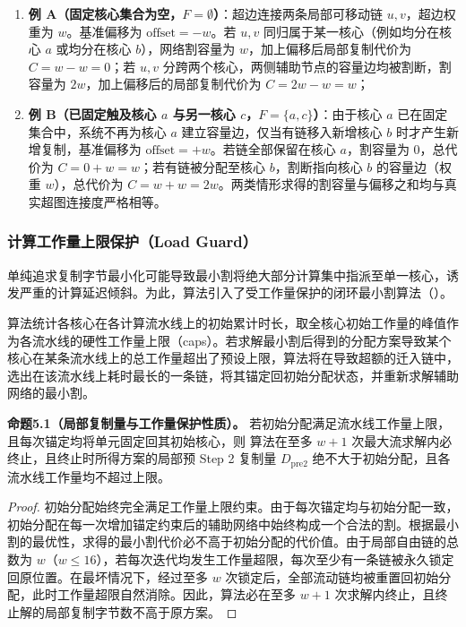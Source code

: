 \documentclass[anonymous,notoc]{gmcm2026}
\providecommand{\tightlist}{\setlength{\itemsep}{0pt}\setlength{\parskip}{0pt}}
\begin{document}
\begin{enumerate}
\def\labelenumi{\arabic{enumi}.}
\tightlist
\item
  \textbf{例 A（固定核心集合为空，\(F = \emptyset\)）}：超边连接两条局部可移动链 \(u, v\)，超边权重为 \(w\)。基准偏移为 \(\text{offset} = -w\)。若 \(u, v\) 同归属于某一核心（例如均分在核心 \(a\) 或均分在核心 \(b\)），网络割容量为 \(w\)，加上偏移后局部复制代价为 \(C = w - w = 0\)；若 \(u, v\) 分跨两个核心，两侧辅助节点的容量边均被割断，割容量为 \(2w\)，加上偏移后的局部复制代价为 \(C = 2w - w = w\)；
\item
  \textbf{例 B（已固定触及核心 \(a\) 与另一核心 \(c\)，\(F = \{a, c\}\)）}：由于核心 \(a\) 已在固定集合中，系统不再为核心 \(a\) 建立容量边，仅当有链移入新增核心 \(b\) 时才产生新增复制，基准偏移为 \(\text{offset} = +w\)。若链全部保留在核心 \(a\)，割容量为 0，总代价为 \(C = 0 + w = w\)；若有链被分配至核心 \(b\)，割断指向核心 \(b\) 的容量边（权重 \(w\)），总代价为 \(C = w + w = 2w\)。两类情形求得的割容量与偏移之和均与真实超图连接度严格相等。
\end{enumerate}

\subsubsection{计算工作量上限保护（Load Guard）}

单纯追求复制字节最小化可能导致最小割将绝大部分计算集中指派至单一核心，诱发严重的计算延迟倾斜。为此，算法引入了受工作量保护的闭环最小割算法（\texttt{}）。

算法统计各核心在各计算流水线上的初始累计时长，取全核心初始工作量的峰值作为各流水线的硬性工作量上限（caps）。若求解最小割后得到的分配方案导致某个核心在某条流水线上的总工作量超出了预设上限，算法将在导致超额的迁入链中，选出在该流水线上耗时最长的一条链，将其锚定回初始分配状态，并重新求解辅助网络的最小割。

\textbf{命题5.1（局部复制量与工作量保护性质）。} 若初始分配满足流水线工作量上限，且每次锚定均将单元固定回其初始核心，则 \texttt{} 算法在至多 \(w + 1\) 次最大流求解内必终止，且终止时所得方案的局部预 Step 2 复制量 \(D_{\mathrm{pre2}}\) 绝不大于初始分配，且各流水线工作量均不超过上限。

\begin{proof} 初始分配始终完全满足工作量上限约束。由于每次锚定均与初始分配一致，初始分配在每一次增加锚定约束后的辅助网络中始终构成一个合法的割。根据最小割的最优性，求得的最小割代价必不高于初始分配的代价值。由于局部自由链的总数为 \(w\)（\(w \le 16\)），若每次迭代均发生工作量超限，每次至少有一条链被永久锁定回原位置。在最坏情况下，经过至多 \(w\) 次锁定后，全部流动链均被重置回初始分配，此时工作量超限自然消除。因此，算法必在至多 \(w + 1\) 次求解内终止，且终止解的局部复制字节数不高于原方案。 \end{proof}
\end{document}
